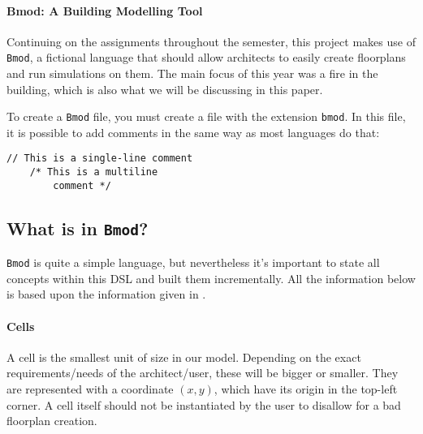 \documentclass[review]{elsarticle}
\begin{document}
\paragraph{Bmod: A Building Modelling Tool} Continuing on the assignments throughout the semester, this project makes use of \texttt{Bmod}, a fictional language that should allow architects to easily create floorplans and run simulations on them. The main focus of this year was a fire in the building, which is also what we will be discussing in this paper.

To create a \texttt{Bmod} file, you must create a file with the extension \texttt{bmod}. In this file, it is possible to add comments in the same way as most languages do that:
\begin{lstlisting}[language=Bmod]
	// This is a single-line comment
	/* This is a multiline
		comment */
\end{lstlisting}

\subsection{What is in \texttt{Bmod}?}

\texttt{Bmod} is quite a simple language, but nevertheless it's important to state all concepts within this \textsf{DSL} and built them incrementally. All the information below is based upon the information given in \cite{A1}.

\paragraph{Cells} A cell is the smallest unit of size in our model. Depending on the exact requirements/needs of the architect/user, these will be bigger or smaller. They are represented with a coordinate $(x, y)$, which have its origin in the top-left corner. A cell itself should not be instantiated by the user to disallow for a bad floorplan creation.
\end{document}
